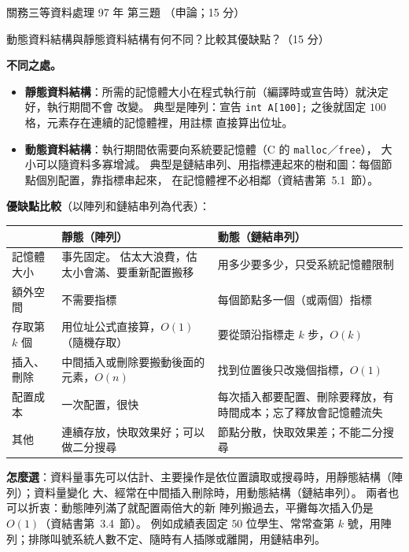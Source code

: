 \begin{pastexam}[label={px:gw3-097-ds-03}]{關務三等資料處理 97 年 第三題}
（申論；15 分）

動態資料結構與靜態資料結構有何不同？比較其優缺點？（15 分）
\end{pastexam}

\begin{pastsoln}
\textbf{不同之處。}
\begin{itemize}[nosep]
\item \textbf{靜態資料結構}：所需的記憶體大小在程式執行前（編譯時或宣告時）就決定好，執行期間不會
改變。 典型是陣列：宣告 \texttt{int A[100];} 之後就固定 $100$ 格，元素存在連續的記憶體裡，用註標
直接算出位址。
\item \textbf{動態資料結構}：執行期間依需要向系統要記憶體（C 的 \texttt{malloc}／\texttt{free}），
大小可以隨資料多寡增減。 典型是鏈結串列、用指標連起來的樹和圖：每個節點個別配置，靠指標串起來，
在記憶體裡不必相鄰（資結書第~5.1~節）。
\end{itemize}

\textbf{優缺點比較}（以陣列和鏈結串列為代表）：
\begin{center}
\small
\begin{tabular}{p{2.6cm}p{5cm}p{5cm}}
\toprule
 & 靜態（陣列） & 動態（鏈結串列） \\
\midrule
記憶體大小 & 事先固定。 估太大浪費，估太小會滿、要重新配置搬移 & 用多少要多少，只受系統記憶體限制 \\
額外空間 & 不需要指標 & 每個節點多一個（或兩個）指標 \\
存取第 $k$ 個 & 用位址公式直接算，$O(1)$（隨機存取） & 要從頭沿指標走 $k$ 步，$O(k)$ \\
插入、刪除 & 中間插入或刪除要搬動後面的元素，$O(n)$ & 找到位置後只改幾個指標，$O(1)$ \\
配置成本 & 一次配置，很快 & 每次插入都要配置、刪除要釋放，有時間成本；忘了釋放會記憶體流失 \\
其他 & 連續存放，快取效果好；可以做二分搜尋 & 節點分散，快取效果差；不能二分搜尋 \\
\bottomrule
\end{tabular}
\end{center}

\textbf{怎麼選}：資料量事先可以估計、主要操作是依位置讀取或搜尋時，用靜態結構（陣列）；資料量變化
大、經常在中間插入刪除時，用動態結構（鏈結串列）。 兩者也可以折衷：動態陣列滿了就配置兩倍大的新
陣列搬過去，平攤每次插入仍是 $O(1)$（資結書第~3.4~節）。 例如成績表固定 $50$ 位學生、常常查第 $k$
號，用陣列；排隊叫號系統人數不定、隨時有人插隊或離開，用鏈結串列。
\end{pastsoln}
